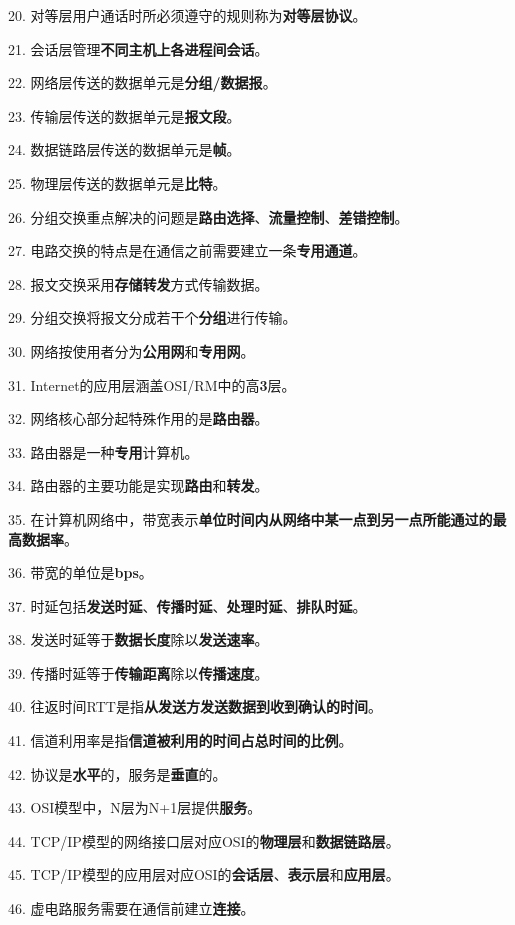 \documentclass[12pt,a4paper,openany]{ctexbook}
\begin{document}
20. 对等层用户通话时所必须遵守的规则称为\textbf{对等层协议}。

21. 会话层管理\textbf{不同主机上各进程间会话}。

22. 网络层传送的数据单元是\textbf{分组/数据报}。

23. 传输层传送的数据单元是\textbf{报文段}。

24. 数据链路层传送的数据单元是\textbf{帧}。

25. 物理层传送的数据单元是\textbf{比特}。

26. 分组交换重点解决的问题是\textbf{路由选择}、\textbf{流量控制}、\textbf{差错控制}。

27. 电路交换的特点是在通信之前需要建立一条\textbf{专用通道}。

28. 报文交换采用\textbf{存储转发}方式传输数据。

29. 分组交换将报文分成若干个\textbf{分组}进行传输。

30. 网络按使用者分为\textbf{公用网}和\textbf{专用网}。

31. Internet的应用层涵盖OSI/RM中的高\textbf{3}层。

32. 网络核心部分起特殊作用的是\textbf{路由器}。

33. 路由器是一种\textbf{专用}计算机。

34. 路由器的主要功能是实现\textbf{路由}和\textbf{转发}。

35. 在计算机网络中，带宽表示\textbf{单位时间内从网络中某一点到另一点所能通过的最高数据率}。

36. 带宽的单位是\textbf{bps}。

37. 时延包括\textbf{发送时延}、\textbf{传播时延}、\textbf{处理时延}、\textbf{排队时延}。

38. 发送时延等于\textbf{数据长度}除以\textbf{发送速率}。

39. 传播时延等于\textbf{传输距离}除以\textbf{传播速度}。

40. 往返时间RTT是指\textbf{从发送方发送数据到收到确认的时间}。

41. 信道利用率是指\textbf{信道被利用的时间占总时间的比例}。

42. 协议是\textbf{水平}的，服务是\textbf{垂直}的。

43. OSI模型中，N层为N+1层提供\textbf{服务}。

44. TCP/IP模型的网络接口层对应OSI的\textbf{物理层}和\textbf{数据链路层}。

45. TCP/IP模型的应用层对应OSI的\textbf{会话层}、\textbf{表示层}和\textbf{应用层}。

46. 虚电路服务需要在通信前建立\textbf{连接}。
\end{document}

